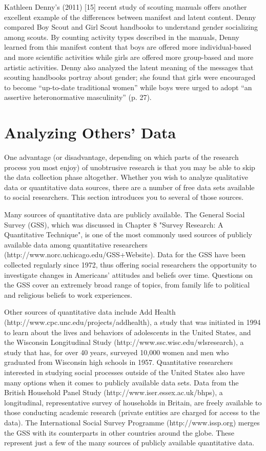 Kathleen Denny’s (2011) [15] recent study of scouting manuals offers another excellent example of the differences between manifest and latent content. Denny compared Boy Scout and Girl Scout handbooks to understand gender socializing among scouts. By counting activity types described in the manuals, Denny learned from this manifest content that boys are offered more individual-based and more scientific activities while girls are offered more group-based and more artistic activities. Denny also analyzed the latent meaning of the messages that scouting handbooks portray about gender; she found that girls were encouraged to become “up-to-date traditional women” while boys were urged to adopt “an assertive heteronormative masculinity” (p. 27).


\section{Analyzing Others' Data}


One advantage (or disadvantage, depending on which parts of the research process you most enjoy) of unobtrusive research is that you may be able to skip the data collection phase altogether. Whether you wish to analyze qualitative data or quantitative data sources, there are a number of free data sets available to social researchers. This section introduces you to several of those sources.

Many sources of quantitative data are publicly available. The General Social Survey (GSS), which was discussed in Chapter 8 "Survey Research: A Quantitative Technique", is one of the most commonly used sources of publicly available data among quantitative researchers (http://www.norc.uchicago.edu/GSS+Website). Data for the GSS have been collected regularly since 1972, thus offering social researchers the opportunity to investigate changes in Americans’ attitudes and beliefs over time. Questions on the GSS cover an extremely broad range of topics, from family life to political and religious beliefs to work experiences.

Other sources of quantitative data include Add Health (http://www.cpc.unc.edu/projects/addhealth), a study that was initiated in 1994 to learn about the lives and behaviors of adolescents in the United States, and the Wisconsin Longitudinal Study (http://www.ssc.wisc.edu/wlsresearch), a study that has, for over 40 years, surveyed 10,000 women and men who graduated from Wisconsin high schools in 1957. Quantitative researchers interested in studying social processes outside of the United States also have many options when it comes to publicly available data sets. Data from the British Household Panel Study (http://www.iser.essex.ac.uk/bhps), a longitudinal, representative survey of households in Britain, are freely available to those conducting academic research (private entities are charged for access to the data). The International Social Survey Programme (http://www.issp.org) merges the GSS with its counterparts in other countries around the globe. These represent just a few of the many sources of publicly available quantitative data.

